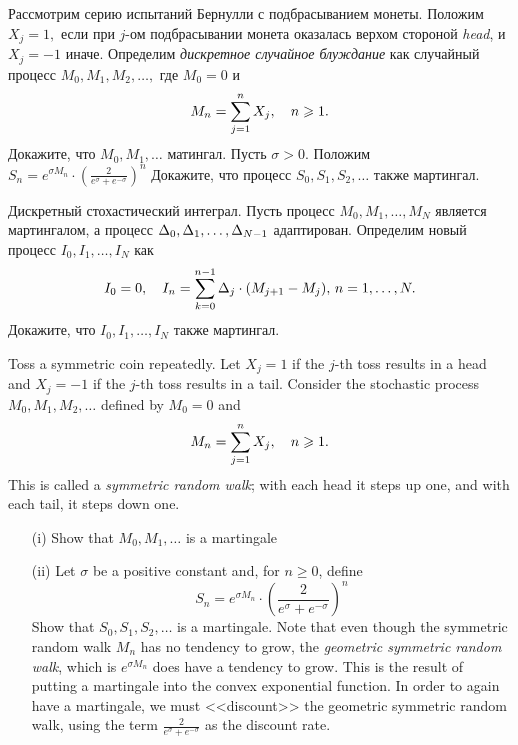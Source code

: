 \begin{problem}
 Рассмотрим серию испытаний Бернулли с подбрасыванием монеты. Положим $X_j=1,$
  если при $j$-ом подбрасывании монета оказалась верхом стороной \emph{head}, и
  $X_j=-1$ иначе. Определим \emph{дискретное случайное блуждание} как
  случайный процесс $M_0,M_1,M_2,\dots,$ где $M_0=0$ и
\[
  M_n=\sum\limits_{j=1}^{n} X_j,\quad n\geqslant 1.
\]
  \ni Докажите, что $M_0,M_1,\dots$ матингал. Пусть $\sigma>0.$
  Положим $S_n=e^{\sigma M_n}\cdot\left(\frac{2}{e^{\sigma}+e^{-\sigma}} \right)^n$
  \ni Докажите, что процесс $S_0,S_1,S_2,\dots$ также мартингал.

\begin{sol}

\end{sol}
\end{problem}

\begin{problem}
 Дискретный стохастический интеграл. Пусть процесс $M_0,M_1,\dots,M_N$ является
  мартингалом, а процесс $\Delta_0,\Delta_1,\dots,\Delta_{N-1}$ адаптирован. Определим новый процесс
  $I_0,I_1,\dots,I_N$ как
 \[
  I_0=0,\quad I_n=\sum\limits_{k=0}^{n-1} \Delta_j\cdot (M_{j+1}-M_j),\, n=1,\dots,N.
\]
  \ni Докажите, что $I_0,I_1,\dots,I_N$ также мартингал.

\begin{sol}

\end{sol}
\end{problem}

\begin{problem}
 Toss a symmetric coin repeatedly. Let $X_j=1$ if the $j$-th toss
results in a head and $X_j=-1$ if the $j$-th toss results in a tail. Consider the
stochastic process $M_0,M_1,M_2,\dots$ defined by $M_0=0$ and
\[
M_n=\sum\limits_{j=1}^{n} X_j,\quad n\geqslant 1.
\]
\ni This is called a \emph{symmetric random walk}; with each head it steps up one,
and with each tail, it steps down one.

\begin{itemize}
\item[(i)] Show that $M_0,M_1,\dots$ is a martingale

\item[(ii)] Let $\sigma$ be a positive constant and, for $n\ge 0$, define
\[
S_n=e^{\sigma M_n}\cdot\left(\frac{2}{e^{\sigma}+e^{-\sigma}} \right)^n
\]
\ni Show that $S_0,S_1,S_2,\dots$ is a martingale. Note that even though the symmetric random
walk $M_n$ has no tendency to grow, the \emph{geometric symmetric random walk}, which is
$e^{\sigma M_n}$ does have a tendency to grow. This is the result of putting a martingale into
the convex exponential function. In order to again have a martingale, we must <<discount>> the
geometric symmetric random walk, using the term  $\frac{2}{e^{\sigma}+e^{-\sigma}}$ as the discount rate.
\end{itemize}

\begin{sol}

\end{sol}
\end{problem}

